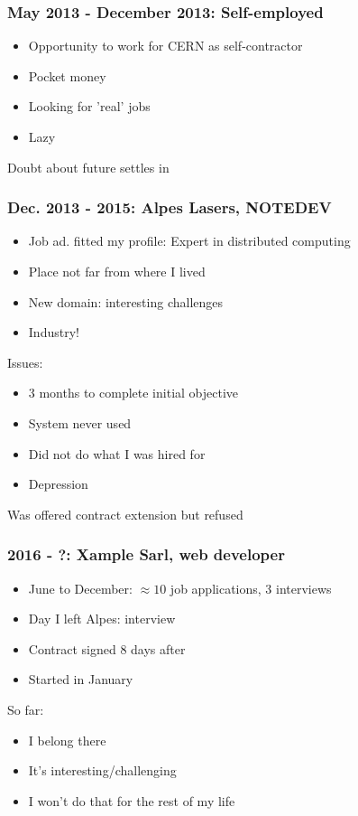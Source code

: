 \documentclass[]{beamer}
\begin{document}
\begin{frame}
\frametitle{May 2013 - December 2013: Self-employed}
\begin{itemize}
\item Opportunity to work for CERN as self-contractor
\item Pocket money
\item Looking for 'real' jobs
\item Lazy
\end{itemize}
Doubt about future settles in
\end{frame}

\begin{frame}
\frametitle{Dec. 2013 - 2015: Alpes Lasers, NOTEDEV}
\begin{itemize}
\item Job ad. fitted my profile: Expert in distributed computing
\item Place not far from where I lived
\item New domain: interesting challenges
\item Industry!
\end{itemize}
\pause
Issues:
\begin{itemize}
\item 3 months to complete initial objective
\item System never used
\item Did not do what I was hired for
\item Depression
\end{itemize}
Was offered contract extension but refused
\end{frame}

\begin{frame}
\frametitle{2016 - ?: Xample Sarl, web developer}
\begin{itemize}
\item June to December: $\approx 10$ job applications, 3 interviews
\item Day I left Alpes: interview
\item Contract signed 8 days after
\item Started in January
\end{itemize}
\pause
So far:
\begin{itemize}
\item I belong there
\item It's interesting/challenging
\item I won't do that for the rest of my life
\end{itemize}
\end{frame}
\end{document}
